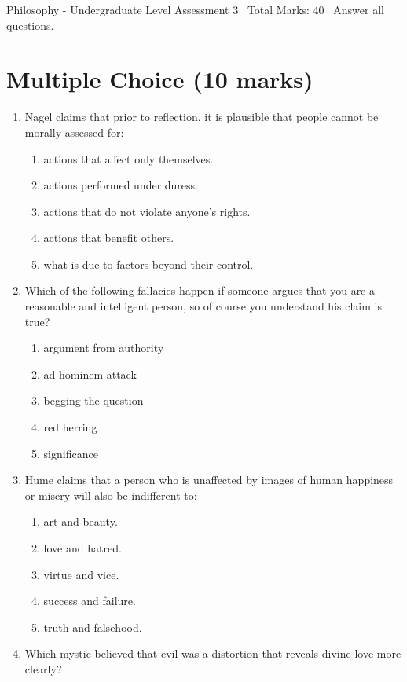 \documentclass[12pt]{article}
\begin{document}
\begin{center}
Philosophy - Undergraduate Level Assessment 3 \
Total Marks: 40 \
Answer all questions.
\end{center}

\section*{Multiple Choice (10 marks)}
\begin{enumerate}[label=\arabic*.]
\item Nagel claims that prior to reflection, it is plausible that people cannot be morally assessed for:
\begin{enumerate}[label=(\alph*)]
    \item actions that affect only themselves.
    \item actions performed under duress.
    \item actions that do not violate anyone's rights.
    \item actions that benefit others.
    \item what is due to factors beyond their control.
\end{enumerate}
\item Which of the following fallacies happen if someone argues that you are a reasonable and intelligent person, so of course you understand his claim is true?
\begin{enumerate}[label=(\alph*)]
    \item argument from authority
    \item ad hominem attack
    \item begging the question
    \item red herring
    \item significance
\end{enumerate}
\item Hume claims that a person who is unaffected by images of human happiness or misery will also be indifferent to:
\begin{enumerate}[label=(\alph*)]
    \item art and beauty.
    \item love and hatred.
    \item virtue and vice.
    \item success and failure.
    \item truth and falsehood.
\end{enumerate}
\item Which mystic believed that evil was a distortion that reveals divine love more clearly?

\end{enumerate}
\end{document}
